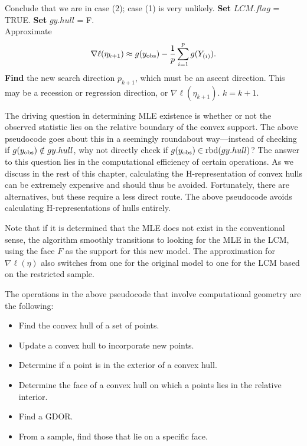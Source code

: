 {{\begin{algorithmic}
			\State Conclude that we are in case (2); case (1) is very unlikely.
			\State \textbf{Set} $LCM.flag$ = TRUE.
			\State \textbf{Set} $gy.hull$ = F.
		\EndIf
	\EndIf
\EndIf\\
	\State Approximate 
	\begin{align} \label{E:nabla ell approx LCM}
	\nabla \ell( \eta_{k+1}) \approx g(y_{\text{obs}}) - \frac{1}{p}\sum_{i=1}^p g(Y_{(i)}).
	\end{align}
\State \textbf{Find} the new search direction $p_{k+1}$, which must be an ascent 
direction.
\State This may be a recession or regression direction, or $\nabla \ell( \eta_{k+1})$.
\State $k = k + 1$.
\EndWhile
\end{algorithmic}
}
}

The driving question in determining MLE existence is
whether or not the observed statistic lies on the relative boundary 
of the convex support.
The above pseudocode goes about this in a seemingly roundabout way---instead
of checking if $g(y_{\text{obs}}) \notin gy.hull$, why not directly check 
if $g(y_{\text{obs}}) \in \operatorname{rbd} (gy.hull)$?  The answer to this question lies
in the computational efficiency of certain operations.  As we discuss
in the rest of this chapter, calculating the H-representation of convex hulls
can be extremely expensive and should thus be avoided.
Fortunately, there are alternatives, but these require a less direct route.  The 
above pseudocode avoids calculating H-representations of hulls entirely.  

Note that if it is determined that the MLE does not exist in the conventional sense,
the algorithm smoothly transitions to looking for the MLE in the LCM, using the 
face $F$ as the support for this new model.  The approximation for $\nabla \ell (\eta)$
also switches from one for the original model to one for the LCM based on the restricted
sample.  

The operations in the above pseudocode that involve computational geometry are the following:
\begin{itemize}
\item Find the convex hull of a set of points.
\item Update a convex hull to incorporate new points.
\item Determine if a point is in the exterior of a convex hull.
\item Determine the face of a convex hull on which a points lies in the relative interior.
\item Find a GDOR.
\item From a sample, find those that lie on a specific face.
\end{itemize}


